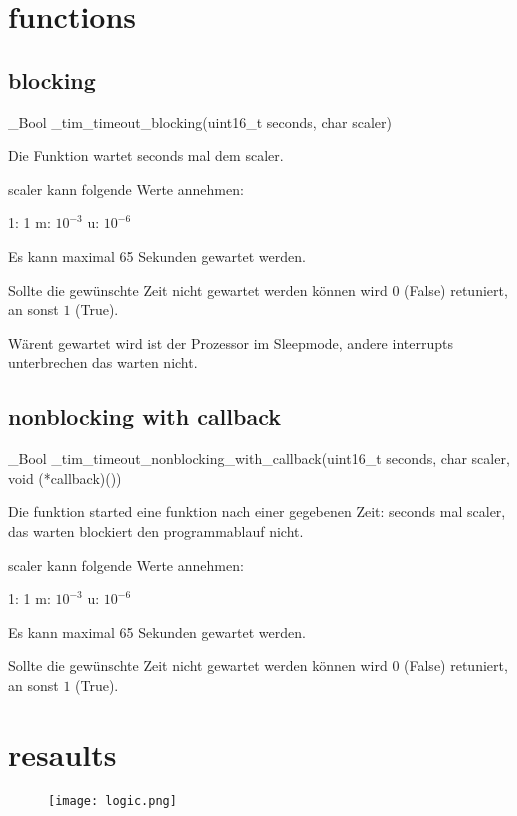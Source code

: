 \documentclass{article}
\begin{document}
\section*{functions}

\subsection*{blocking}

\_Bool \_tim\_timeout\_blocking(uint16\_t seconds, char scaler)

Die Funktion wartet seconds mal dem scaler.

scaler kann folgende Werte annehmen:

1: 1\newline
m: $10^{-3}$\newline
u: $10^{-6}$

Es kann maximal 65 Sekunden gewartet werden.

Sollte die gewünschte Zeit nicht gewartet werden können wird $0$ (False) retuniert, an sonst $1$ (True).

Wärent gewartet wird ist der Prozessor im Sleepmode, andere interrupts unterbrechen das warten nicht.

\subsection*{nonblocking with callback}

\_Bool \_tim\_timeout\_nonblocking\_with\_callback(uint16\_t seconds, char scaler, void (*callback)())

Die funktion started eine funktion nach einer gegebenen Zeit: seconds mal scaler, das warten blockiert den programmablauf nicht.

scaler kann folgende Werte annehmen:

1: 1\newline
m: $10^{-3}$\newline
u: $10^{-6}$

Es kann maximal 65 Sekunden gewartet werden.

Sollte die gewünschte Zeit nicht gewartet werden können wird $0$ (False) retuniert, an sonst $1$ (True).

\section*{resaults}

\begin{figure}[h]
  \centering
  \texttt{[image: logic.png]}
  
\end{figure}
\end{document}
